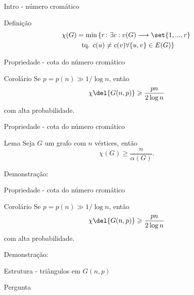 \documentclass{beamer}
\begin{document}
    \begin{frame}{Intro - número cromático}
        \begin{block}{Definição}
            \begin{multline*}
                \chi(G)=\min \left\lbrace r\colon\exists c:v(G)\longrightarrow\set{1,...,r}\right.\\
                \left.\textup{ tq. }c(u)\neq c(v)\forall \{u,v\}\in E(G)\right\rbrace
            \end{multline*}
        \end{block}
    \end{frame}

    \begin{frame}{Propriedade - cota do número cromático}
        \begin{block}{Corolário}
            Se $p=p(n)\gg 1/\log n$, então
            \[ \chi\del{G(n,p)}\geqslant\dfrac{pn}{2\log n} \]
            com alta probabilidade.
        \end{block}
    \end{frame}

    \begin{frame}{Propriedade - cota do número cromático}
        \vspace{-0.5cm}
        \begin{block}{Lema}
            Seja $G$ um grafo com $n$ vértices, então
            \[\chi(G)\geqslant\dfrac{n}{\alpha(G)}.\]
        \end{block}
        \begin{exampleblock}{Demonstração:}
        \end{exampleblock} \vspace{\stretch4}
    \end{frame}


    \begin{frame}{Propriedade - cota do número cromático}
        \vspace{-0.5cm}
        \begin{block}{Corolário}
            Se $p=p(n)\gg 1/\log n$, então
            \[ \chi\del{G(n,p)}\geqslant\dfrac{pn}{2\log n} \]
            com alta probabilidade.
        \end{block}
        \begin{exampleblock}{Demonstração:}
        \end{exampleblock} \vspace{\stretch4}
    \end{frame}

    \begin{frame}{Estrutura - triângulos em $G(n,p)$}
        \vspace{\stretch1}
        \begin{exampleblock}{Pergunta}
        \end{exampleblock}
        \vspace{\stretch2}
    \end{frame}
\end{document}
